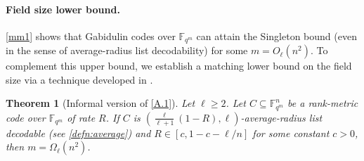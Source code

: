 \documentclass[11pt]{article}
\theoremstyle{plain}
\newtheorem{thm}{Theorem}[section]
\theoremstyle{definition}
\theoremstyle{remark}
\newcommand{\F}{\mathbb{F}}
\begin{document}
\paragraph{Field size lower bound.} 
\cref{mm1} shows that Gabidulin codes over $\F_{q^m}$ can attain the Singleton bound (even in the sense of average-radius list decodability) for some $m=O_\ell(n^2)$.
To complement this upper bound, we establish a matching lower bound on the field size via a technique developed in \cite{alrabiah2023ag}. 
\begin{thm}[Informal version of \cref{A.1}]\label{thm:informal-lower-bound}
Let $\ell\geq 2$.
Let $C\subseteq\F_{q^{m}}^{n}$ be a rank-metric code over $\F_{q^m}$ of rate $R$. If $C$ is $\left(\frac{\ell}{\ell+1}(1-R),\ell\right)$-average-radius list decodable (see \cref{defn:average}) and $R\in [c, 1-c-\ell/n]$ for some constant $c>0$, then $m=\Omega_{\ell}(n^2)$.
\end{thm}
\end{document}
